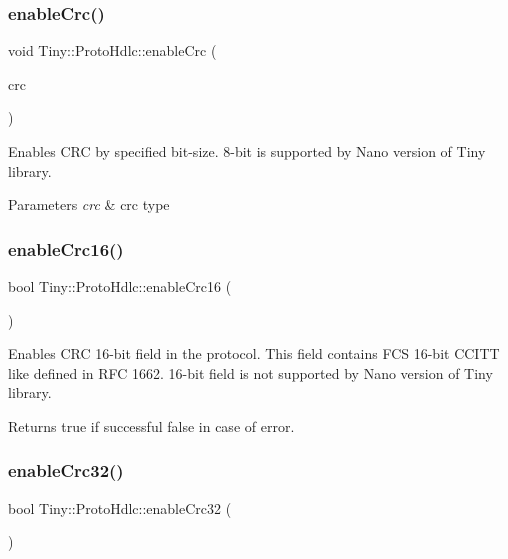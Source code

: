 \subsubsection{\texorpdfstring{enable\+Crc()}{enableCrc()}}
{\footnotesize\ttfamily void Tiny\+::\+Proto\+Hdlc\+::enable\+Crc (\begin{DoxyParamCaption}\item[{\hyperlink{group__HDLC__API_gabb73b32d08d8e79eefe9385634a74bf7}{hdlc\+\_\+crc\+\_\+t}}]{crc }\end{DoxyParamCaption})}

Enables C\+RC by specified bit-\/size. 8-\/bit is supported by Nano version of Tiny library. 
\begin{DoxyParams}{Parameters}
{\em crc} & crc type \\
\hline
\end{DoxyParams}
\mbox{\label{classTiny_1_1ProtoHdlc_a693fb4301071e0b2d3bfd818265f22c6}} 
\subsubsection{\texorpdfstring{enable\+Crc16()}{enableCrc16()}}
{\footnotesize\ttfamily bool Tiny\+::\+Proto\+Hdlc\+::enable\+Crc16 (\begin{DoxyParamCaption}{ }\end{DoxyParamCaption})}

Enables C\+RC 16-\/bit field in the protocol. This field contains F\+CS 16-\/bit C\+C\+I\+TT like defined in R\+FC 1662. 16-\/bit field is not supported by Nano version of Tiny library. \begin{DoxyReturn}{Returns}
true if successful false in case of error. 
\end{DoxyReturn}
\mbox{\label{classTiny_1_1ProtoHdlc_a2f0b1557415ea384e7b1279c3618d4c0}} 
\subsubsection{\texorpdfstring{enable\+Crc32()}{enableCrc32()}}
{\footnotesize\ttfamily bool Tiny\+::\+Proto\+Hdlc\+::enable\+Crc32 (\begin{DoxyParamCaption}{ }\end{DoxyParamCaption})}


